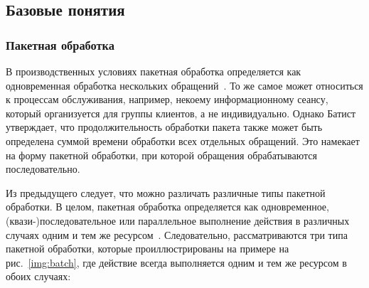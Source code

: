 %

\subsection{Базовые понятия}

\subsubsection{Пакетная обработка}

В производственных условиях пакетная обработка определяется как одновременная обработка нескольких обращений~\cite{pinedo2012scheduling}. 
То же самое может относиться к процессам обслуживания, например, некоему информационному сеансу, который организуется для группы клиентов, а не индивидуально. 
Однако Батист~\cite{Baptiste2000} утверждает, что продолжительность обработки пакета также может быть определена суммой времени обработки всех отдельных обращений. 
Это намекает на форму пакетной обработки, при которой обращения обрабатываются последовательно. 

Из предыдущего следует, что можно различать различные типы пакетной обработки. 
В целом, пакетная обработка определяется как одновременное, (квази-)последовательное или параллельное выполнение действия в различных случаях одним и тем же ресурсом~\cite{Martin2015BatchPD}. 
Следовательно, рассматриваются три типа пакетной обработки, которые проиллюстрированы на примере на рис.~\ref{img:batch}, где действие всегда выполняется одним и тем же ресурсом в обоих случаях:

